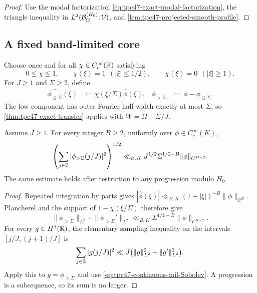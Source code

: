 \begin{proof}
Use the modal factorization
\eqref{eq:tpc47-exact-modal-factorization}, the triangle inequality in
\(L^2(\mathcal B_{\Omega}^{(H_0)};\mathcal V)\), and
\cref{lem:tpc47-projected-smooth-profile}.
\end{proof}

\subsection{A fixed band-limited core}

Choose once and for all \(\chi\in C_c^\infty(\mathbb R)\) satisfying
\begin{equation}
 0\le\chi\le1,
 \qquad
 \chi(\xi)=1\ \ (|\xi|\le1/2),
 \qquad
 \chi(\xi)=0\ \ (|\xi|\ge1).
 \label{eq:tpc47-frequency-cutoff}
\end{equation}
For \(J\ge1\) and \(\Sigma\ge2\), define
\begin{align}
 \widehat{\phi_{\le\Sigma}}(\xi)
 &:=\chi(\xi/\Sigma)\widehat\phi(\xi),
 &\phi_{>\Sigma}&:=\phi-\phi_{\le\Sigma}.
 \label{eq:tpc47-profile-low-high-split}
\end{align}
The low component has outer Fourier half-width exactly at most
\(\Sigma\), so \cref{thm:tpc47-exact-transfer} applies with
\(W=\Omega+\Sigma/J\).

\begin{lemma}
\label{lem:tpc47-sampled-tail}
Assume \(J\ge1\).  For every integer \(B\ge2\), uniformly over
\(\phi\in C_c^\infty(K)\),
\begin{equation}
 \left(
 \sum_{j\in\mathbb Z}|\phi_{>\Sigma}(j/J)|^2
 \right)^{1/2}
 \ll_{B,K}
 J^{1/2}\Sigma^{1/2-B}\|\phi\|_{C^{B+2}}.
 \label{eq:tpc47-sampled-tail-bound}
\end{equation}
The same estimate holds after restriction to any progression modulo
\(H_0\).
\end{lemma}

\begin{proof}
Repeated integration by parts gives
\(|\widehat\phi(\xi)|\ll_{B,K}
 (1+|\xi|)^{-B}\|\phi\|_{C^B}\).  Plancherel and the support of
\(1-\chi(\xi/\Sigma)\) therefore give
\begin{equation}
 \|\phi_{>\Sigma}\|_{L^2}+
 \|\phi_{>\Sigma}'\|_{L^2}
 \ll_{B,K}\Sigma^{1/2-B}\|\phi\|_{C^{B+2}}.
 \label{eq:tpc47-continuous-tail-Sobolev}
\end{equation}
For every \(g\in H^1(\mathbb R)\), the elementary sampling inequality on
the intervals \([j/J,(j+1)/J]\) is
\begin{equation}
 \sum_{j\in\mathbb Z}|g(j/J)|^2
 \ll J\bigl(\|g\|_{L^2}^2+\|g'\|_{L^2}^2\bigr).
 \label{eq:tpc47-sampling-Sobolev}
\end{equation}
Apply this to \(g=\phi_{>\Sigma}\) and use
\eqref{eq:tpc47-continuous-tail-Sobolev}.  A progression is a
subsequence, so its sum is no larger.
\end{proof}

